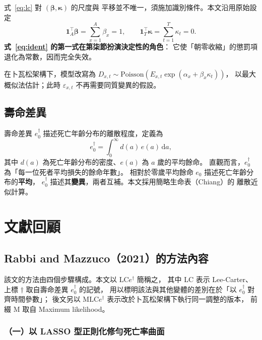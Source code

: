 \documentclass[UTF8, fontset=macnew, a4paper, 12pt]{ctexart}
\newcommand{\edag}{e_0^{\dagger}}
\newcommand{\LCe}{\mathrm{LC}e^{\dagger}}
\begin{document}
式~\eqref{eq:lc} 對 $(\boldsymbol{\beta},\boldsymbol{\kappa})$ 的尺度與
平移並不唯一，須施加識別條件。本文沿用原始設定
\begin{equation}\label{eq:ident}
\mathbf{1}_A^{\!\top}\boldsymbol{\beta}=\sum_{x=1}^{A}\beta_x=1,
\qquad
\mathbf{1}_T^{\!\top}\boldsymbol{\kappa}=\sum_{t=1}^{T}\kappa_t=0 .
\end{equation}
\textbf{式~\eqref{eq:ident} 的第一式在第柒節扮演決定性的角色}：
它使「朝零收縮」的懲罰項退化為常數，因而完全失效。

在卜瓦松架構下，模型改寫為
$D_{x,t}\sim\text{Poisson}\!\left(E_{x,t}\exp(\alpha_x+\beta_x\kappa_t)\right)$，
以最大概似法估計；此時 $\varepsilon_{x,t}$ 不再需要同質變異的假設。

\subsection{壽命差異}

壽命差異 $\edag$ 描述死亡年齡分布的離散程度，定義為
\begin{equation}\label{eq:edag}
\edag=\int_0^{\infty} d(a)\,e(a)\,\mathrm{d}a ,
\end{equation}
其中 $d(a)$ 為死亡年齡分布的密度、$e(a)$ 為 $a$ 歲的平均餘命。
直觀而言，$\edag$ 為「每一位死者平均損失的餘命年數」。
相對於零歲平均餘命 $e_0$ 描述死亡年齡分布的\textbf{平均}，
$\edag$ 描述其\textbf{變異}，兩者互補。本文採用簡略生命表（Chiang）的
離散近似計算。

\section{文獻回顧}

\subsection{Rabbi and Mazzuco（2021）的方法內容}

該文的方法由四個步驟構成。本文以 $\LCe$ 簡稱之，
其中 LC 表示 Lee-Carter、上標 $\dagger$ 取自壽命差異 $\edag$ 的記號，
用以標明該法與其他變體的差別在於「以 $\edag$ 對齊時間參數」；
後文另以 M$\LCe$ 表示改於卜瓦松架構下執行同一調整的版本，
前綴 M 取自 Maximum likelihood。

\subsubsection{（一）以 LASSO 型正則化修勻死亡率曲面}
\end{document}
